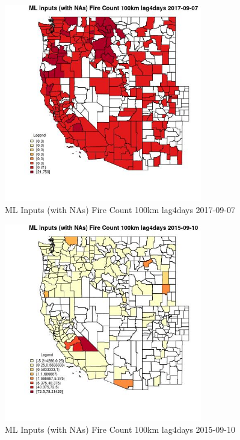 \begin{figure} 
\centering  
\includegraphics[width=0.77\textwidth]{Code_Outputs/Report_ML_input_PM25_Step4_part_e_de_duplicated_aves_compiled_2019-05-20wNAs_CountyFire_Count_100km_lag4daysMean2017-09-07.jpg} 
\caption{\label{fig:Report_ML_input_PM25_Step4_part_e_de_duplicated_aves_compiled_2019-05-20wNAsCountyFire_Count_100km_lag4daysMean2017-09-07}ML Inputs (with NAs) Fire Count 100km lag4days 2017-09-07} 
\end{figure} 
 

\begin{figure} 
\centering  
\includegraphics[width=0.77\textwidth]{Code_Outputs/Report_ML_input_PM25_Step4_part_e_de_duplicated_aves_compiled_2019-05-20wNAs_CountyFire_Count_100km_lag4daysMean2015-09-10.jpg} 
\caption{\label{fig:Report_ML_input_PM25_Step4_part_e_de_duplicated_aves_compiled_2019-05-20wNAsCountyFire_Count_100km_lag4daysMean2015-09-10}ML Inputs (with NAs) Fire Count 100km lag4days 2015-09-10} 
\end{figure} 
 

